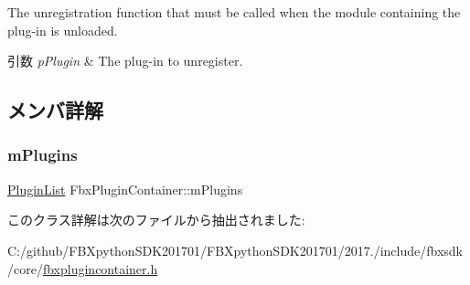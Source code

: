 The unregistration function that must be called when the module containing the plug-\/in is unloaded. 
\begin{DoxyParams}{引数}
{\em p\+Plugin} & The plug-\/in to unregister. \\
\hline
\end{DoxyParams}


\subsection{メンバ詳解}
\mbox{\label{class_fbx_plugin_container_a89a3739ecdf85a1eaeb72ad8bd8a0587}} 
\subsubsection{\texorpdfstring{m\+Plugins}{mPlugins}}
{\footnotesize\ttfamily \hyperlink{class_fbx_plugin_container_a42abd8471efa91f56de2c4c64c220972}{Plugin\+List} Fbx\+Plugin\+Container\+::m\+Plugins\hspace{0.3cm}{\ttfamily [protected]}}



このクラス詳解は次のファイルから抽出されました\+:\begin{DoxyCompactItemize}
\item 
C\+:/github/\+F\+B\+Xpython\+S\+D\+K201701/\+F\+B\+Xpython\+S\+D\+K201701/2017./include/fbxsdk/core/\hyperlink{fbxplugincontainer_8h}{fbxplugincontainer.\+h}\end{DoxyCompactItemize}
